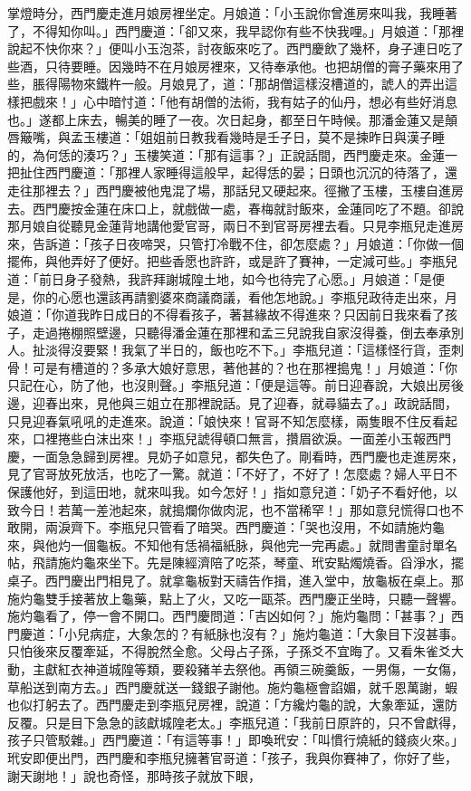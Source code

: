 掌燈時分，西門慶走進月娘房裡坐定。月娘道：「小玉說你曾進房來叫我，我睡著了，不得知你叫。」西門慶道：「卻又來，我早認你有些不快我哩。」月娘道：「那裡說起不快你來？」便叫小玉泡茶，討夜飯來吃了。西門慶飲了幾杯，身子連日吃了些酒，只待要睡。因幾時不在月娘房裡來，又待奉承他。也把胡僧的膏子藥來用了些，脹得陽物來鐵杵一般。月娘見了，道：「那胡僧這樣沒槽道的，諕人的弄出這樣把戲來！」心中暗忖道：「他有胡僧的法術，我有姑子的仙丹，想必有些好消息也。」遂都上床去，暢美的睡了一夜。次日起身，都至日午時候。那潘金蓮又是顛唇簸嘴，與孟玉樓道：「姐姐前日教我看幾時是壬子日，莫不是揀昨日與漢子睡的，為何恁的湊巧？」玉樓笑道：「那有這事？」正說話間，西門慶走來。金蓮一把扯住西門慶道：「那裡人家睡得這般早，起得恁的晏；日頭也沉沉的待落了，還走往那裡去？」西門慶被他鬼混了場，那話兒又硬起來。徑撇了玉樓，玉樓自進房去。西門慶按金蓮在床口上，就戲做一處，春梅就討飯來，金蓮同吃了不題。卻說那月娘自從聽見金蓮背地講他愛官哥，兩日不到官哥房裡去看。只見李瓶兒走進房來，告訴道：「孩子日夜啼哭，只管打冷戰不住，卻怎麼處？」月娘道：「你做一個擺佈，與他弄好了便好。把些香愿也許許，或是許了賽神，一定減可些。」李瓶兒道：「前日身子發熱，我許拜謝城隍土地，如今也待完了心愿。」月娘道：「是便是，你的心愿也還該再請劉婆來商議商議，看他怎地說。」李瓶兒政待走出來，月娘道：「你道我昨日成日的不得看孩子，著甚緣故不得進來？只因前日我來看了孩子，走過捲棚照壁邊，只聽得潘金蓮在那裡和孟三兒說我自家沒得養，倒去奉承別人。扯淡得沒要緊！我氣了半日的，飯也吃不下。」李瓶兒道：「這樣怪行貨，歪刺骨！可是有槽道的？多承大娘好意思，著他甚的？也在那裡搗鬼！」月娘道：「你只記在心，防了他，也沒則聲。」李瓶兒道：「便是這等。前日迎春說，大娘出房後邊，迎春出來，見他與三姐立在那裡說話。見了迎春，就尋貓去了。」政說話間，只見迎春氣吼吼的走進來。說道：「娘快來！官哥不知怎麼樣，兩隻眼不住反看起來，口裡捲些白沫出來！」李瓶兒諕得頓口無言，攢眉欲淚。一面差小玉報西門慶，一面急急歸到房裡。見奶子如意兒，都失色了。剛看時，西門慶也走進房來，見了官哥放死放活，也吃了一驚。就道：「不好了，不好了！怎麼處？婦人平日不保護他好，到這田地，就來叫我。如今怎好！」指如意兒道：「奶子不看好他，以致今日！若萬一差池起來，就搗爛你做肉泥，也不當稀罕！」那如意兒慌得口也不敢開，兩淚齊下。李瓶兒只管看了暗哭。西門慶道：「哭也沒用，不如請施灼龜來，與他灼一個龜板。不知他有恁禍福紙脉，與他完一完再處。」就問書童討單名帖，飛請施灼龜來坐下。先是陳經濟陪了吃茶，琴童、玳安點燭燒香。舀淨水，擺桌子。西門慶出門相見了。就拿龜板對天禱告作揖，進入堂中，放龜板在桌上。那施灼龜雙手接著放上龜藥，點上了火，又吃一甌茶。西門慶正坐時，只聽一聲響。施灼龜看了，停一會不開口。西門慶問道：「吉凶如何？」施灼龜問：「甚事？」西門慶道：「小兒病症，大象怎的？有紙脉也沒有？」施灼龜道：「大象目下沒甚事。只怕後來反覆牽延，不得脫然全愈。父母占子孫，子孫爻不宜晦了。又看朱雀爻大動，主獻紅衣神道城隍等類，要殺豬羊去祭他。再領三碗羹飯，一男傷，一女傷，草船送到南方去。」西門慶就送一錢銀子謝他。施灼龜極會諂媚，就千恩萬謝，蝦也似打躬去了。西門慶走到李瓶兒房裡，說道：「方纔灼龜的說，大象牽延，還防反覆。只是目下急急的該獻城隍老太。」李瓶兒道：「我前日原許的，只不曾獻得，孩子只管駁雜。」西門慶道：「有這等事！」即喚玳安：「叫慣行燒紙的錢痰火來。」玳安即便出門，西門慶和李瓶兒擁著官哥道：「孩子，我與你賽神了，你好了些，謝天謝地！」說也奇怪，那時孩子就放下眼，